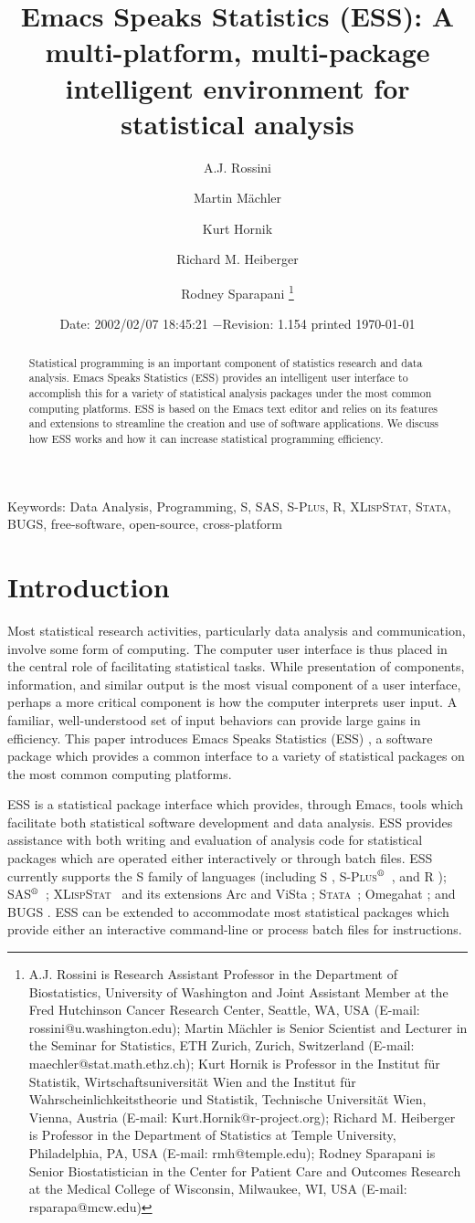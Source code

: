 \documentclass{article}
\title{Emacs Speaks Statistics (ESS): A multi-platform, multi-package
intelligent environment for statistical analysis}
\author{A.J. Rossini \and Martin M{\"a}chler \and Kurt Hornik \and Richard
  M. Heiberger \and Rodney Sparapani \footnote{%
    A.J. Rossini is Research Assistant Professor in the Department of
    Biostatistics, University of Washington and Joint Assistant Member at
    the Fred Hutchinson Cancer Research Center, Seattle, WA, USA
    (E-mail: rossini@u.washington.edu);
    Martin M{\"a}chler is Senior Scientist and Lecturer in the Seminar for
    Statistics, ETH Zurich, Zurich, Switzerland
    (E-mail: maechler@stat.math.ethz.ch);
    Kurt Hornik is Professor in the Institut f{\"u}r Statistik,
    Wirtschaftsuniversit{\"a}t Wien and the Institut f{\"u}r
    Wahrscheinlichkeitstheorie und Statistik, Technische Universit{\"a}t
    Wien, Vienna, Austria (E-mail: Kurt.Hornik@r-project.org);
    Richard M. Heiberger is Professor in the Department of Statistics at
    Temple University, Philadelphia, PA, USA (E-mail: rmh@temple.edu);
    Rodney Sparapani is Senior Biostatistician in the Center for Patient
    Care and Outcomes Research at the Medical College of Wisconsin, 
    Milwaukee, WI, USA (E-mail: rsparapa@mcw.edu)}}
\date{$ $Date: 2002/02/07 18:45:21 $ - $Revision: 1.154 $ $\tiny printed \today}
\newif\ifdraft
\renewcommand{\baselinestretch}{1.5}
\newcommand*{\regstrd}{$^{\mbox{\scriptsize{\textregistered}}}$}
\newcommand*{\SAS}{\textsc{SAS}}
\newcommand*{\Splus}{\textsc{S-Plus}}
\newcommand*{\XLispStat}{\textsc{XLispStat}}
\newcommand*{\Stata}{\textsc{Stata}}
\begin{document}

\ifdraft
\setcounter{page}{0}
\tableofcontents
\fi

\maketitle

\ifdraft{}%
\else%
 \renewcommand{\baselinestretch}{1.5}
\fi

\begin{abstract}
  Statistical programming is an important component of statistics
  research and data analysis.  Emacs Speaks Statistics (ESS) provides
  an intelligent user interface to accomplish this for a variety of
  statistical analysis packages under the most common computing
  platforms.  ESS is based on the Emacs text editor and relies on its
  features and extensions to streamline the creation and use of
  software applications.  We discuss how ESS works and how it can
  increase statistical programming efficiency.
\end{abstract}

\noindent Keywords: Data Analysis, Programming, 
S, \SAS, \Splus, R, \XLispStat, \Stata, BUGS, free-software,
open-source, cross-platform

\section{Introduction}
\label{sec:introduction}

Most statistical research activities, particularly data analysis and
communication, involve some form of computing.  The computer user
interface is thus placed in the central role of facilitating
statistical tasks.  While presentation of components, information, and
similar output is the most visual component of a user interface,
perhaps a more critical component is how the computer interprets user
input.  A familiar, well-understood set of input behaviors can provide
large gains in efficiency.  This paper introduces Emacs Speaks
Statistics (ESS) \citep{ESS}, a software package which provides a
common interface to a variety of statistical packages on the most
common computing platforms.

ESS is a statistical package interface which provides, through Emacs,
tools which facilitate both statistical software development and data
analysis.  ESS provides assistance with both writing and evaluation of
analysis code for statistical packages which are operated either
interactively or through batch files.  ESS currently supports the S
family of languages (including S \citep{BecRCW88,ChaJH92,ChaJ98},
\Splus\regstrd\ \citep{Splus}, and R \citep{ihak:gent:1996});
\SAS\regstrd\ \citep{SAS:8}; \XLispStat\ \citep{Tier90} and its
extensions Arc \citep{Cook:Weisberg:1999} and ViSta
\citep{youn:fald:mcfa:1992}; \Stata\ \citep{Stata:6.0}; Omegahat
\citep{DTLang:2000}; and BUGS \citep{BUGS}.  ESS can be extended to
accommodate most statistical packages which provide either an
interactive command-line or process batch files for instructions.
\end{document}
